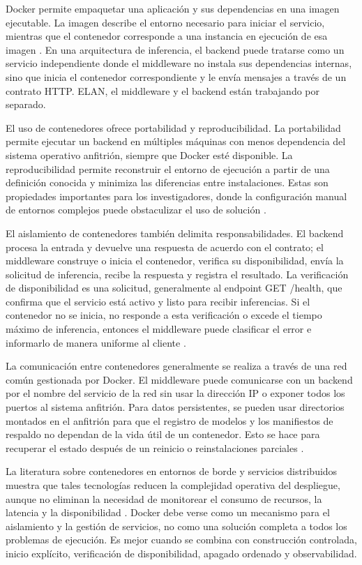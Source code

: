 \documentclass[11pt,a4paper]{article}
\begin{document}
Docker permite empaquetar una aplicación y sus dependencias en una imagen ejecutable. La imagen describe el entorno necesario para iniciar el servicio, mientras que el contenedor corresponde a una instancia en ejecución de esa imagen \cite{docker2026overview}. En una arquitectura de inferencia, el backend puede tratarse como un servicio independiente donde el middleware no instala sus dependencias internas, sino que inicia el contenedor correspondiente y le envía mensajes a través de un contrato HTTP. ELAN, el middleware y el backend están trabajando por separado.

El uso de contenedores ofrece portabilidad y reproducibilidad. La portabilidad permite ejecutar un backend en múltiples máquinas con menos dependencia del sistema operativo anfitrión, siempre que Docker esté disponible. La reproducibilidad permite reconstruir el entorno de ejecución a partir de una definición conocida y minimiza las diferencias entre instalaciones. Estas son propiedades importantes para los investigadores, donde la configuración manual de entornos complejos puede obstaculizar el uso de solución \cite{docker2026overview,gupta2025performance}.

El aislamiento de contenedores también delimita responsabilidades. El backend procesa la entrada y devuelve una respuesta de acuerdo con el contrato; el middleware construye o inicia el contenedor, verifica su disponibilidad, envía la solicitud de inferencia, recibe la respuesta y registra el resultado. La verificación de disponibilidad es una solicitud, generalmente al endpoint GET /health, que confirma que el servicio está activo y listo para recibir inferencias. Si el contenedor no se inicia, no responde a esta verificación o excede el tiempo máximo de inferencia, entonces el middleware puede clasificar el error e informarlo de manera uniforme al cliente \cite{docker2026overview}.

La comunicación entre contenedores generalmente se realiza a través de una red común gestionada por Docker. El middleware puede comunicarse con un backend por el nombre del servicio de la red sin usar la dirección IP o exponer todos los puertos al sistema anfitrión. Para datos persistentes, se pueden usar directorios montados en el anfitrión para que el registro de modelos y los manifiestos de respaldo no dependan de la vida útil de un contenedor. Esto se hace para recuperar el estado después de un reinicio o reinstalaciones parciales \cite{docker2026overview}.

La literatura sobre contenedores en entornos de borde y servicios distribuidos muestra que tales tecnologías reducen la complejidad operativa del despliegue, aunque no eliminan la necesidad de monitorear el consumo de recursos, la latencia y la disponibilidad \cite{gupta2025performance}. Docker debe verse como un mecanismo para el aislamiento y la gestión de servicios, no como una solución completa a todos los problemas de ejecución. Es mejor cuando se combina con construcción controlada, inicio explícito, verificación de disponibilidad, apagado ordenado y observabilidad.
\end{document}
